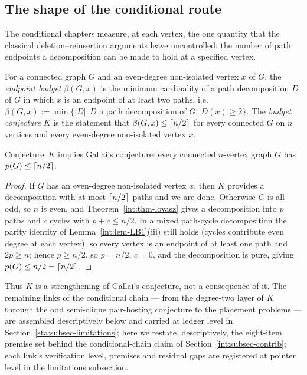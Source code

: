 \subsection{The shape of the conditional route}\label{int:subsec-conditional}

The conditional chapters measure, at each vertex, the one quantity that the classical
deletion--reinsertion arguments leave uncontrolled: the number of path endpoints a
decomposition can be made to hold at a specified vertex.

\begin{definition}\label{int:def-budget}
For a connected graph $G$ and an even-degree non-isolated vertex $x$ of $G$, the
\emph{endpoint budget} $\beta(G,x)$ is the minimum cardinality of a path decomposition $D$
of $G$ in which $x$ is an endpoint of at least two paths, i.e.\
$\beta(G,x):=\min\{|D| : D \text{ a path decomposition of } G,\ D(x)\ge2\}$. The
\emph{budget conjecture} $K$ is the statement that $\beta(G,x)\le\left\lceil n/2 \right\rceil$ for every
connected $G$ on $n$ vertices and every even-degree non-isolated vertex $x$.
\end{definition}

\begin{theorem}\label{int:thm-Kgallai}
Conjecture~$K$ implies Gallai's conjecture: every connected $n$-vertex graph $G$ has
$p(G)\le\left\lceil n/2 \right\rceil$.
\end{theorem}

\begin{proof}
If $G$ has an even-degree non-isolated vertex $x$, then $K$ provides a decomposition with
at most $\left\lceil n/2 \right\rceil$ paths and we are done. Otherwise $G$ is all-odd, so $n$ is even, and
Theorem~\ref{int:thm-lovasz} gives a decomposition into $p$ paths and $c$ cycles with
$p+c\le n/2$. In a mixed path-cycle decomposition the parity identity of
Lemma~\ref{int:lem-LB1}(iii) still holds (cycles contribute even degree at each vertex), so
every vertex is an endpoint of at least one path and $2p\ge n$; hence $p\ge n/2$, so
$p=n/2$, $c=0$, and the decomposition is pure, giving $p(G)\le n/2=\left\lceil n/2 \right\rceil$.
\end{proof}

Thus $K$ is a strengthening of Gallai's conjecture, not a consequence of it. The remaining
links of the conditional chain --- from the degree-two layer of $K$ through the odd
semi-clique pair-hosting conjecture to the placement problems --- are assembled descriptively
below and carried at ledger level in Section~\ref{sta:subsec-limitations}; here we restate,
descriptively, the eight-item premise set behind the conditional-chain claim of
Section~\ref{int:subsec-contrib}; each link's verification level, premises and residual gaps
are registered at pointer level in the limitations subsection.

